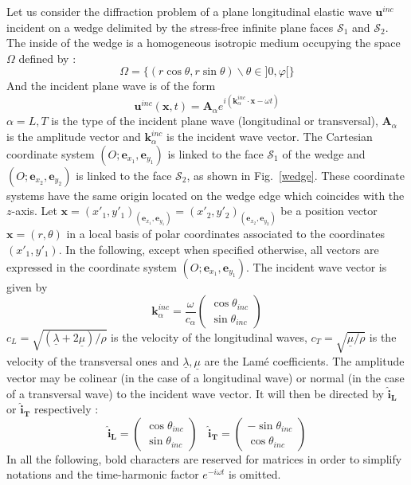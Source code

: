 Let us consider the diffraction problem of a plane longitudinal elastic wave $\mathbf{u}^{inc}$ incident on a wedge delimited by the stress-free infinite plane faces $\mathcal{S}_1$ and $\mathcal{S}_2$. The inside of the wedge is a homogeneous isotropic medium occupying the space $\Omega$ defined by :
\begin{equation}
\Omega=\{ (r\cos \theta, r \sin \theta) \backslash \theta \in \rbrack 0, \varphi \lbrack \} 
\end{equation}
And the incident plane wave is of the form
\begin{equation}
\mathbf{u}^{inc}(\mathbf{x},t)=\mathbf{A}_{\alpha}e^{i(\mathbf{k}_{\alpha}^{inc}\cdot \mathbf{x}-\omega t)}
\end{equation}
$\alpha=L,T$ is the type of the incident plane wave (longitudinal or transversal), $\mathbf{A}_{\alpha}$ is the amplitude vector and $\mathbf{k}_{\alpha}^{inc}$ is the incident wave vector. The Cartesian coordinate system $(O; \mathbf{e}_{x_1}, \mathbf{e}_{y_1} )$ is linked to the face $\mathcal{S}_1$ of the wedge and $(O;  \mathbf{e}_{x_2}, \mathbf{e}_{y_2} )$ is linked to the face $\mathcal{S}_2$, as shown in Fig.~\ref{wedge}. These coordinate systems have the same origin located on the wedge edge which coincides with the $z$-axis. Let $\mathbf{x} = (x'_1,y'_1)_{ (\mathbf{e}_{x_1}, \mathbf{e}_{y_1}) } = (x'_2,y'_2)_{ (\mathbf{e}_{x_2}, \mathbf{e}_{y_2})}$ be a position vector $\mathbf{x} = (r,\theta)$ in a local basis of polar coordinates associated to the coordinates $(x'_1,y'_1)$. In the following, except when specified otherwise, all vectors are expressed in the coordinate system  $(O; \mathbf{e}_{x_1}, \mathbf{e}_{y_1} )$. The incident wave vector is given by 
\begin{equation}
\mathbf{k}_{\alpha}^{inc}=\frac{\omega}{c_{\alpha}} 
\begin{pmatrix}
\cos\theta_{inc} \\ 
\sin\theta_{inc} 
\end{pmatrix}
\end{equation}
$c_L=\sqrt{(\underline{\lambda}+2\underline{\mu})/\rho}$ is the velocity of the longitudinal waves,  $c_T=\sqrt{\underline{\mu}/\rho}$ is the velocity of the transversal ones and $\underline{\lambda}, \underline{\mu}$ are the Lam\'{e} coefficients. The amplitude vector may be colinear (in the case of a longitudinal wave) or normal (in the case of a transversal wave) to the incident wave vector. It will then be directed by $\mathbf{\hat{i}_L}$ or $\mathbf{\hat{i}_{T}}$ respectively :
\begin{equation}
\mathbf{\hat{i}_L} = \begin{pmatrix}
\cos\theta_{inc} \\ \sin\theta_{inc}
\end{pmatrix}
~~~~
\mathbf{\hat{i}_{T}} = \begin{pmatrix}
-\sin\theta_{inc} \\ \cos\theta_{inc}
\end{pmatrix}
\label{ivec}
\end{equation}
In all the following, bold characters are reserved for matrices in order to simplify notations and the time-harmonic factor $e^{-i\omega t}$ is omitted.

